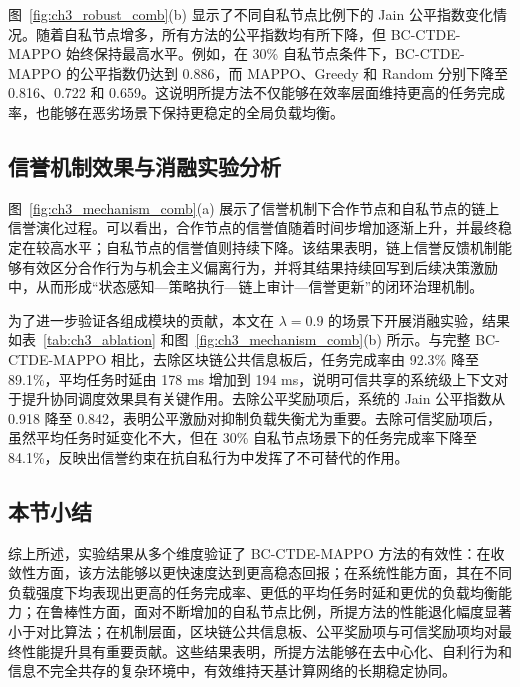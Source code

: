 图~\ref{fig:ch3_robust_comb}(b) 显示了不同自私节点比例下的 Jain 公平指数变化情况。随着自私节点增多，所有方法的公平指数均有所下降，但 BC-CTDE-MAPPO 始终保持最高水平。例如，在 30\% 自私节点条件下，BC-CTDE-MAPPO 的公平指数仍达到 0.886，而 MAPPO、Greedy 和 Random 分别下降至 0.816、0.722 和 0.659。这说明所提方法不仅能够在效率层面维持更高的任务完成率，也能够在恶劣场景下保持更稳定的全局负载均衡。

\subsection{信誉机制效果与消融实验分析}
图~\ref{fig:ch3_mechanism_comb}(a) 展示了信誉机制下合作节点和自私节点的链上信誉演化过程。可以看出，合作节点的信誉值随着时间步增加逐渐上升，并最终稳定在较高水平；自私节点的信誉值则持续下降。该结果表明，链上信誉反馈机制能够有效区分合作行为与机会主义偏离行为，并将其结果持续回写到后续决策激励中，从而形成“状态感知—策略执行—链上审计—信誉更新”的闭环治理机制。

为了进一步验证各组成模块的贡献，本文在 $\lambda=0.9$ 的场景下开展消融实验，结果如表~\ref{tab:ch3_ablation} 和图~\ref{fig:ch3_mechanism_comb}(b) 所示。与完整 BC-CTDE-MAPPO 相比，去除区块链公共信息板后，任务完成率由 92.3\% 降至 89.1\%，平均任务时延由 178 ms 增加到 194 ms，说明可信共享的系统级上下文对于提升协同调度效果具有关键作用。去除公平奖励项后，系统的 Jain 公平指数从 0.918 降至 0.842，表明公平激励对抑制负载失衡尤为重要。去除可信奖励项后，虽然平均任务时延变化不大，但在 30\% 自私节点场景下的任务完成率下降至 84.1\%，反映出信誉约束在抗自私行为中发挥了不可替代的作用。

\subsection{本节小结}
综上所述，实验结果从多个维度验证了 BC-CTDE-MAPPO 方法的有效性：在收敛性方面，该方法能够以更快速度达到更高稳态回报；在系统性能方面，其在不同负载强度下均表现出更高的任务完成率、更低的平均任务时延和更优的负载均衡能力；在鲁棒性方面，面对不断增加的自私节点比例，所提方法的性能退化幅度显著小于对比算法；在机制层面，区块链公共信息板、公平奖励项与可信奖励项均对最终性能提升具有重要贡献。这些结果表明，所提方法能够在去中心化、自利行为和信息不完全共存的复杂环境中，有效维持天基计算网络的长期稳定协同。
